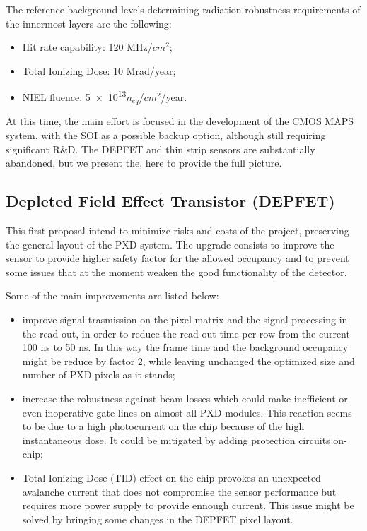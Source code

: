 The reference background levels determining radiation robustness requirements of the innermost layers are the following:

\begin{itemize}
\item Hit rate capability: 120 MHz/$cm^{2}$;
\item Total Ionizing Dose: 10 Mrad/year;
\item NIEL fluence: \num{5e13}$n_{eq}$/$cm^{2}$/year.
\end{itemize}

At this time, the main effort is focused in the development of the CMOS MAPS system, with the SOI as a possible backup option, although still requiring significant R\&D. The DEPFET and thin strip sensors are substantially abandoned, but we present the, here to provide the full picture.


\subsection{Depleted Field Effect Transistor (DEPFET)}

This first proposal intend to minimize risks and costs of the project, preserving the general layout of the PXD system. The upgrade consists to improve the sensor to provide higher safety factor for the allowed occupancy and to prevent some issues that at the moment weaken the good functionality of the detector.

Some of the main improvements are listed below:

\begin{itemize}
\item improve signal trasmission on the pixel matrix and the signal processing in the read-out, in order to reduce the read-out time per row from the current 100 ns to 50 ns. In this way the frame time and the background occupancy might be reduce by factor 2, while leaving unchanged the optimized size and number of PXD pixels as it stands;
\item increase the robustness against beam losses which could make inefficient or even inoperative gate lines on almost all PXD modules. This reaction seems to be due to a high photocurrent on the chip because of the high instantaneous dose. It could be mitigated by adding protection circuits on-chip;
\item Total Ionizing Dose (TID) effect on the chip provokes an unexpected avalanche current that does not compromise the sensor performance but requires more power supply to provide ennough current. This issue might be solved by bringing some changes in the DEPFET pixel layout.
\end{itemize}

